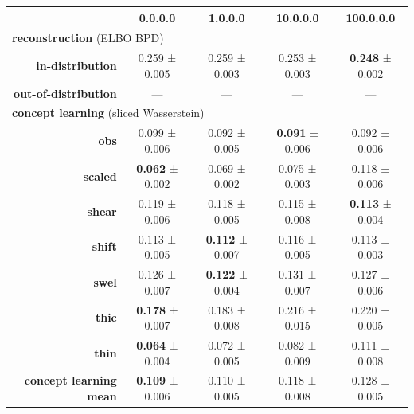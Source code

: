 \begin{tabular}{rcccc}
\toprule
& \textbf{0.0.0.0} & \textbf{1.0.0.0} & \textbf{10.0.0.0} & \textbf{100.0.0.0} \\
\midrule
\multicolumn{ 5 }{l}{\textbf{reconstruction}  (ELBO BPD)} \\
\midrule
\textbf{in-distribution} & 0.259 ± 0.005 & 0.259 ± 0.003 & 0.253 ± 0.003 & \textbf{0.248} ± 0.002 \\
\textbf{out-of-distribution} & --- & --- & --- & --- \\
\midrule
\multicolumn{ 5 }{l}{\textbf{concept learning}  (sliced Wasserstein)} \\
\midrule
\textbf{obs} & 0.099 ± 0.006 & 0.092 ± 0.005 & \textbf{0.091} ± 0.006 & 0.092 ± 0.006 \\
\textbf{scaled} & \textbf{0.062} ± 0.002 & 0.069 ± 0.002 & 0.075 ± 0.003 & 0.118 ± 0.006 \\
\textbf{shear} & 0.119 ± 0.006 & 0.118 ± 0.005 & 0.115 ± 0.008 & \textbf{0.113} ± 0.004 \\
\textbf{shift} & 0.113 ± 0.005 & \textbf{0.112} ± 0.007 & 0.116 ± 0.005 & 0.113 ± 0.003 \\
\textbf{swel} & 0.126 ± 0.007 & \textbf{0.122} ± 0.004 & 0.131 ± 0.007 & 0.127 ± 0.006 \\
\textbf{thic} & \textbf{0.178} ± 0.007 & 0.183 ± 0.008 & 0.216 ± 0.015 & 0.220 ± 0.005 \\
\textbf{thin} & \textbf{0.064} ± 0.004 & 0.072 ± 0.005 & 0.082 ± 0.009 & 0.111 ± 0.008 \\
\addlinespace
\textbf{concept learning mean} & \textbf{0.109} ± 0.006 & 0.110 ± 0.005 & 0.118 ± 0.008 & 0.128 ± 0.005 \\
\midrule
\bottomrule
\end{tabular}